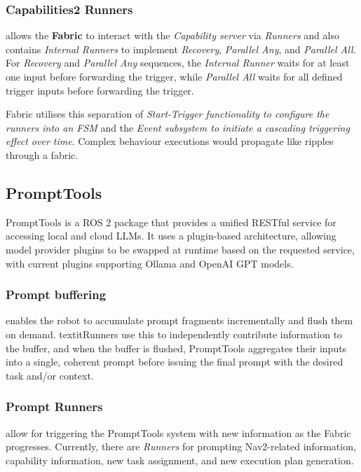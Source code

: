\documentclass[letterpaper, 10pt, conference]{ieeeconf}      %
\begin{document}
\subsubsection{Capabilities2 Runners} allows the \textbf{Fabric} to interact with the \textit{Capability server} via \textit{Runners} and also contains \textit{Internal Runners} to implement \textit{Recovery}, \textit{Parallel Any}, and \textit{Parallel All}. For \textit{Recovery} and \textit{Parallel Any} sequences, the \textit{Internal Runner} waits for at least one input before forwarding the trigger, while \textit{Parallel All} waits for all defined trigger inputs before forwarding the trigger.

Fabric utilises this separation of \textit{Start-Trigger functionality to configure the runners into an FSM} and the \textit{Event subsystem to initiate a cascading triggering effect over time}. Complex behaviour executions would propagate like ripples through a fabric.
    
\subsection{PromptTools}

PromptTools is a ROS 2 package that provides a unified RESTful service for accessing local and cloud LLMs. It uses a plugin-based architecture, allowing model provider plugins to be swapped at runtime based on the requested service, with current plugins supporting Ollama and OpenAI GPT models.

\subsubsection{Prompt buffering} enables the robot to accumulate prompt fragments incrementally and flush them on demand. textit{Runners} use this to independently contribute information to the buffer, and when the buffer is flushed, PromptTools aggregates their inputs into a single, coherent prompt before issuing the final prompt with the desired task and/or context.

\subsubsection{Prompt Runners} allow for triggering the PromptTools system with new information as the Fabric progresses. Currently, there are \textit{Runners} for prompting Nav2-related information, capability information, new task assignment, and new execution plan generation.
\end{document}
